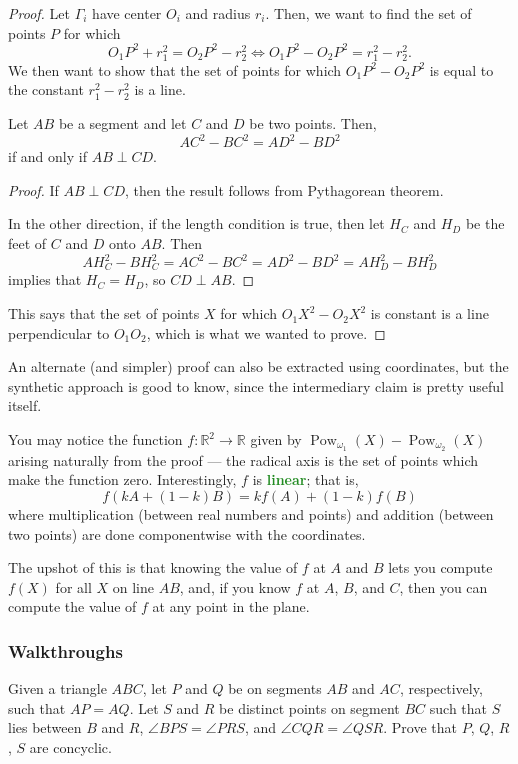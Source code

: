 \documentclass{scrartcl}
\providecommand{\RR}{\mathbb R}
\providecommand{\pow}{\operatorname{Pow}}
\providecommand{\vocab}[1]{{\textbf{\textcolor{ForestGreen}{#1}}}}
\begin{document}
\begin{proof}
	Let $\Gamma_i$ have center $O_i$ and radius $r_i$. Then, we want to find
	the set of points $P$ for which
	\[O_1P^2 + r_1^2 = O_2P^2 - r_2^2 \iff
	O_1P^2 - O_2P^2 = r_1^2 - r_2^2.\]
	We then want to show that the set of points for which
	$O_1P^2 - O_2P^2$ is equal to the constant $r_1^2 - r_2^2$
	is a line.
	
	\begin{claim}
		Let $AB$ be a segment and let $C$ and $D$ be two points.
		Then,
		\[AC^2 - BC^2 = AD^2 - BD^2\]
		if and only if $AB\perp CD$.
	\end{claim}
	\begin{proof}
		If $AB\perp CD$, then the result follows from Pythagorean theorem.
		
		In the other direction, if the length condition is true, then
		let $H_C$ and $H_D$ be the feet of $C$ and $D$ onto $AB$. Then
		\[AH_C^2 - BH_C^2 = AC^2 - BC^2 = AD^2 - BD^2 = AH_D^2 - BH_D^2\]
		implies that $H_C = H_D$, so $CD\perp AB$.
	\end{proof}
	
	This says that the set of points $X$ for which
	$O_1X^2 - O_2X^2$ is constant is a line perpendicular to $O_1O_2$,
	which is what we wanted to prove.
\end{proof}

An alternate (and simpler) proof can also be extracted using coordinates,
but the synthetic approach is good to know, since
the intermediary claim is pretty useful itself.

\begin{remark}
	You may notice the function $f\colon\RR^2\to\RR$
	given by $\pow_{\omega_1}(X)-\pow_{\omega_2}(X)$
	arising naturally from the proof --- the radical axis
	is the set of points which make the function zero.
	Interestingly, $f$ is \vocab{linear}; that is,
	\[f(kA + (1-k)B) = kf(A) + (1-k)f(B)\]
	where multiplication (between real numbers and points) and
	addition (between two points) are done componentwise with the coordinates.
	
	The upshot of this is that knowing the value of $f$ at $A$ and $B$
	lets you compute $f(X)$ for all $X$ on line $AB$,
	and, if you know $f$ at $A$, $B$, and $C$, then you can compute
	the value of $f$ at any point in the plane.
\end{remark}

\pagebreak
\subsubsection{Walkthroughs}
\begin{example}[JMO 2012/1]
	Given a triangle $ABC$, let $P$ and $Q$ be on segments $AB$ and $AC$,
	respectively, such that $AP = AQ$. Let $S$ and $R$ be distinct points
	on segment $BC$ such that $S$ lies between $B$ and $R$,
	$\angle BPS = \angle PRS$, and $\angle CQR = \angle QSR$.
	Prove that $P$, $Q$, $R$, $S$ are concyclic.
\end{example}
\end{document}
